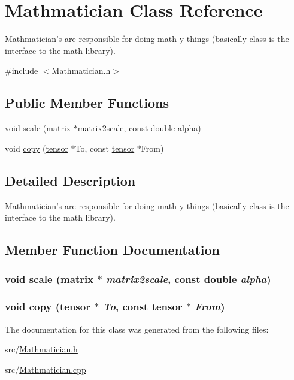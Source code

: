 \hypertarget{classJKBuilder_1_1Mathmatician}{
\section{Mathmatician Class Reference}
\label{classJKBuilder_1_1Mathmatician}
}


Mathmatician's are responsible for doing math-\/y things (basically class is the interface to the math library).  


{\ttfamily \#include $<$Mathmatician.h$>$}\subsection*{Public Member Functions}
\begin{DoxyCompactItemize}
\item 
void \hyperlink{classJKBuilder_1_1Mathmatician_a2fdf5c8c21c798896b5b9d22008340f1}{scale} (\hyperlink{classJKBuilder_1_1matrix}{matrix} $\ast$matrix2scale, const double alpha)
\item 
void \hyperlink{classJKBuilder_1_1Mathmatician_a0fa0e1a12b380900f029c0007ac3d218}{copy} (\hyperlink{classJKBuilder_1_1tensor}{tensor} $\ast$To, const \hyperlink{classJKBuilder_1_1tensor}{tensor} $\ast$From)
\end{DoxyCompactItemize}


\subsection{Detailed Description}
Mathmatician's are responsible for doing math-\/y things (basically class is the interface to the math library). 

\subsection{Member Function Documentation}
\hypertarget{classJKBuilder_1_1Mathmatician_a2fdf5c8c21c798896b5b9d22008340f1}{
\subsubsection[{scale}]{\setlength{\rightskip}{0pt plus 5cm}void scale ({\bf matrix} $\ast$ {\em matrix2scale}, \/  const double {\em alpha})}}
\label{classJKBuilder_1_1Mathmatician_a2fdf5c8c21c798896b5b9d22008340f1}
\hypertarget{classJKBuilder_1_1Mathmatician_a0fa0e1a12b380900f029c0007ac3d218}{
\subsubsection[{copy}]{\setlength{\rightskip}{0pt plus 5cm}void copy ({\bf tensor} $\ast$ {\em To}, \/  const {\bf tensor} $\ast$ {\em From})}}
\label{classJKBuilder_1_1Mathmatician_a0fa0e1a12b380900f029c0007ac3d218}


The documentation for this class was generated from the following files:\begin{DoxyCompactItemize}
\item 
src/\hyperlink{Mathmatician_8h}{Mathmatician.h}\item 
src/\hyperlink{Mathmatician_8cpp}{Mathmatician.cpp}\end{DoxyCompactItemize}
